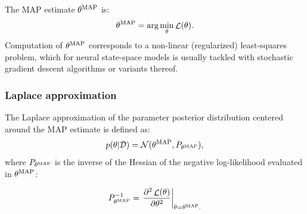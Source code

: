 \documentclass{article}
\DeclareMathOperator{\nll}{\mathcal{L}}
\newcommand{\N}{\mathcal{N}} %
\newcommand{\MAP}{{\rm MAP}}
\newcommand{\D}{\mathcal{D}} %
\begin{document}
The MAP estimate ${\theta^\MAP}$ is:%
\begin{equation}
  \label{eq:theta_map}
 {\theta^\MAP} = \arg \min_\theta \nll(\theta).
\end{equation}
Computation of $\theta^\MAP$ corresponds to a non-linear (regularized) least-squares problem, which for neural state-space models is usually tackled with
stochastic gradient descent algorithms or variants thereof. 
\subsubsection{Laplace approximation}
The Laplace approximation of the parameter posterior distribution centered around the MAP estimate is defined as:
\begin{equation}
 p(\theta | \D) = \N(\theta^\MAP, P_{\theta^\MAP}),
\end{equation}
where 
$P_{\theta^\MAP}$ is the inverse of the Hessian of 
the {negative }log-likelihood evaluated in $\theta^\MAP$:

\begin{equation}
 P_{\theta^\MAP}^{-1} =  \left .\frac{\partial^2 \nll(\theta)}{\partial \theta^2} \right |_{\theta = {\theta^\MAP} .}
\end{equation}
\end{document}
